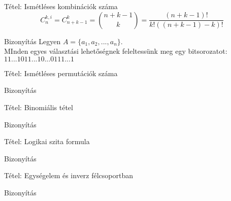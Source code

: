 \documentclass{beamer}
\begin{document}
\begin{frame}

\begin{block}{Tétel: Ismétléses kombinációk száma}
$$C_n^{k, i} = C_{n + k -1}^k = {{n + k - 1}\choose{k}} = \frac{(n + k - 1)!}{k!((n + k - 1) - k)!} $$

\end{block}

\begin{block}{Bizonyítás}
Legyen $A = \{a_1, a_2, ..., a_n\}$.\\
MInden egyes választási lehetőségnek feleltessünk meg egy bitsorozatot:\\
$1 1 ... 1 0 1 1 ... 1 0 ... 0 1 1 1 ... 1$\\


\end{block}

\end{frame}

\begin{frame}

\begin{block}{Tétel: Ismétléses permutációk száma}
\end{block}

\begin{block}{Bizonyítás}
\end{block}

\end{frame}

\begin{frame}

\begin{block}{Tétel: Binomiális tétel}
\end{block}

\begin{block}{Bizonyítás}
\end{block}

\end{frame}

\begin{frame}

\begin{block}{Tétel: Logikai szita formula}
\end{block}

\begin{block}{Bizonyítás}
\end{block}

\end{frame}








\begin{frame}

\begin{block}{Tétel: Egységelem és inverz félcsoportban}
\end{block}

\begin{block}{Bizonyítás}
\end{block}

\end{frame}
\end{document}

